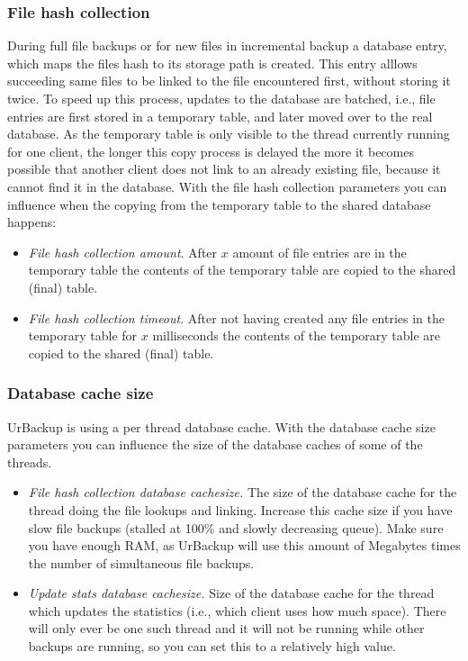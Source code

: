 \documentclass[a4paper,10pt]{article}
\begin{document}
\subsubsection{File hash collection}

During full file backups or for new files in incremental backup a database entry, which
maps the files hash to its storage path is created. This entry alllows succeeding same
files to be linked to the file encountered first, without storing it twice.
To speed up this process, updates to the database are batched, i.e., file entries are first
stored in a temporary table, and later moved over to the real database. As the temporary
table is only visible to the thread currently running for one client, the longer this copy
process is delayed the more it becomes possible that another client does not link to an already
existing file, because it cannot find it in the database.
With the file hash collection parameters you can influence when the copying from the temporary
table to the shared database happens:

\begin{itemize}
  \item \textsl{File hash collection amount}. After $x$ amount of file entries are in the
  temporary table the contents of the temporary table are copied to the shared (final) table.
  \item \textsl{File hash collection timeout}. After not having created any file entries in the
  temporary table for $x$ milliseconds the contents of the temporary table are copied to
  the shared (final) table.
\end{itemize}

\subsubsection{Database cache size}

UrBackup is using a per thread database cache. With the database cache size parameters you can
influence the size of the database caches of some of the threads.

\begin{itemize}
  \item \textsl{File hash collection database cachesize.} The size of the database cache for the
  		thread doing the file lookups and linking. Increase this cache size if you have slow
  		file backups (stalled at 100\% and slowly decreasing queue). Make sure you have enough
  		RAM, as UrBackup will use this amount of Megabytes times the number of simultaneous file
  		backups.
  \item \textsl{Update stats database cachesize.} Size of the database cache for the thread which
  		updates the statistics (i.e., which client uses how much space). There will only ever be
  		one such thread and it will not be running while other backups are running, so you can
  		set this to a relatively high value.
\end{itemize}
\end{document}
